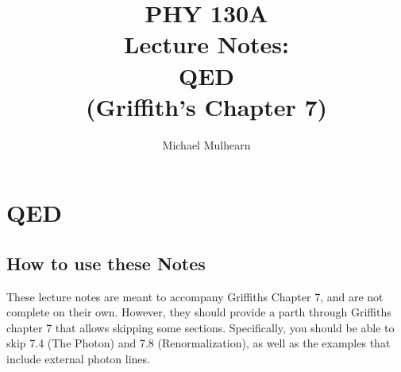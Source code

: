 \documentclass[12pt]{book}
\begin{document}
\title{PHY 130A \\ Lecture Notes: \\ 
QED \\
(Griffith's Chapter 7)}
\author{Michael Mulhearn}

\maketitle


\setcounter{chapter}{6}
\chapter{QED}

\section{How to use these Notes}
These lecture notes are meant to accompany Griffiths Chapter 7, and
are not complete on their own.  However, they should provide a parth
through Griffiths chapter 7 that allows skipping some sections.
Specifically, you should be able to skip 7.4 (The Photon) and 7.8
(Renormalization), as well as the examples that include external
photon lines.
\end{document}
